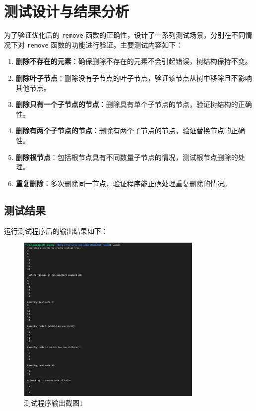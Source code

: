 \documentclass[UTF8]{ctexart}
\begin{document}
\section{测试设计与结果分析}

为了验证优化后的 \texttt{remove} 函数的正确性，设计了一系列测试场景，分别在不同情况下对 \texttt{remove} 函数的功能进行验证。主要测试内容如下：

\begin{enumerate}
    \item \textbf{删除不存在的元素}：确保删除不存在的元素不会引起错误，树结构保持不变。
    \item \textbf{删除叶子节点}：删除没有子节点的叶子节点，验证该节点从树中移除且不影响其他节点。
    \item \textbf{删除只有一个子节点的节点}：删除具有单个子节点的节点，验证树结构的正确性。
    \item \textbf{删除有两个子节点的节点}：删除有两个子节点的节点，验证替换节点的正确性。
    \item \textbf{删除根节点}：包括根节点具有不同数量子节点的情况，测试根节点删除的处理。
    \item \textbf{重复删除}：多次删除同一节点，验证程序能正确处理重复删除的情况。
\end{enumerate}

\subsection{测试结果}
运行测试程序后的输出结果如下：

\begin{figure}[H]
    \centering
    \includegraphics[width=0.8\textwidth]{实验结果0.png}
    \caption{测试程序输出截图1}
\end{figure}
\end{document}
